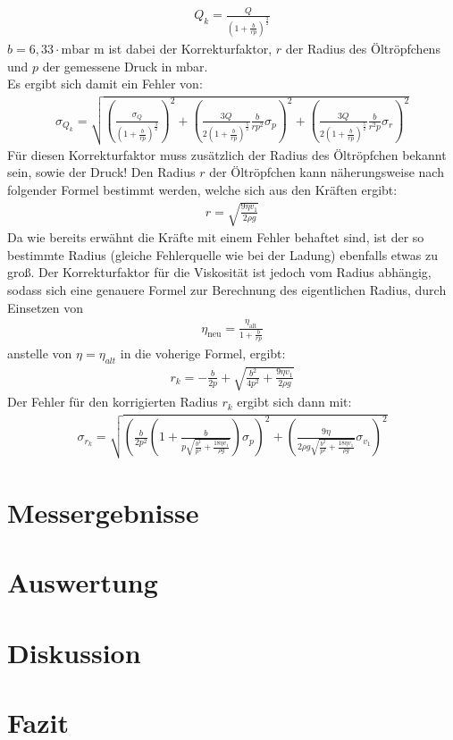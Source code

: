\documentclass[12pt]{scrartcl}
\begin{document}
\begin{align}
Q_k = \frac{Q}{\left(1+\frac{b}{rp}\right)^{\frac{3}{2}}}
\end{align}
$ b = 6,33 \cdot \text{mbar m}$ ist dabei der Korrekturfaktor, $r$ der Radius des Öltröpfchens und $p$ der gemessene Druck in mbar.\\
Es ergibt sich damit ein Fehler von:
\begin{align}
\sigma_{Q_k} = \sqrt{
\left(\frac{\sigma_Q}{\left(1+\frac{b}{rp}\right)^{\frac{3}{2}}}\right)^2+
\left(\frac{3Q}{2\left(1+\frac{b}{rp}\right)^{\frac{5}{2}}}\frac{b}{rp^2}\sigma_p\right)^2+
\left(\frac{3Q}{2\left(1+\frac{b}{rp}\right)^{\frac{5}{2}}}\frac{b}{r^2p}\sigma_r\right)^2
}
\end{align}
Für diesen Korrekturfaktor muss zusätzlich der Radius des Öltröpfchen bekannt sein, sowie der Druck!
Den Radius $r$ der Öltröpfchen kann näherungsweise nach folgender Formel bestimmt werden, welche sich aus den Kräften ergibt:
\begin{align}
r = \sqrt{\frac{9\eta v_1}{2\rho g}}
\end{align}
Da wie bereits erwähnt die Kräfte mit einem Fehler behaftet sind, ist der so bestimmte Radius (gleiche Fehlerquelle wie bei der Ladung) ebenfalls etwas zu groß. Der Korrekturfaktor für die Viskosität ist jedoch vom Radius abhängig, sodass sich eine genauere Formel zur Berechnung des eigentlichen Radius, durch Einsetzen von 
\begin{align}
\eta_{\text{neu}} = \frac{\eta_{\text{alt}}}{1+\frac{b}{rp}}
\end{align} 
anstelle von $\eta = \eta_{alt}$ in die voherige Formel, ergibt:
\begin{align}
r_k = -\frac{b}{2p}+\sqrt{\frac{b^2}{4p^2}+\frac{9\eta v_1}{2\rho g}}
\end{align}
Der Fehler für den korrigierten Radius $r_k$ ergibt sich dann mit:
\begin{align}
\sigma_{r_k} = \sqrt{
\left(\frac{b}{2p^2}\left(1+\frac{b}{p\sqrt{\frac{b^2}{p^2}+\frac{18\eta v_1}{\rho g}}}\right)\sigma_p\right)^2+
\left(\frac{9\eta}{2\rho g\sqrt{\frac{b^2}{p^2}+\frac{18\eta v_1}{\rho g}}}\sigma_{v_1}\right)^2}
\end{align}
\section{Messergebnisse}



\section{Auswertung}


\section{Diskussion}

\section{Fazit}

\end{document}
